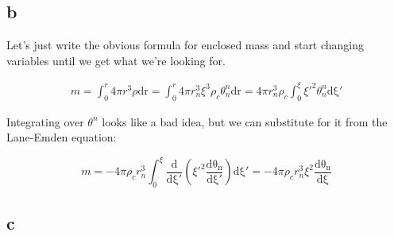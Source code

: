 \documentclass[12pt]{article}
\begin{document}
\subsection*{b}

Let's just write the obvious formula for enclosed mass and start changing variables until we get what we're looking for.

\begin{align*}
m = \int_0^r 4\pi r^3\rho\mathrm{dr} = \int_0^{r}4\pi r_n^3 \xi^3 \rho_c \theta^n_n \mathrm{dr} = 4\pi r_n^3 \rho_c\int_0^{\xi}\xi'^2\theta_n^n\mathrm{d\xi'}
\end{align*}

Integrating over \(\theta^n\) looks like a bad idea, but we can substitute for it from the Lane-Emden equation:

\[ m = -4\pi \rho_c r_n^3 \int_0^{\xi} \frac{\mathrm{d}}{\mathrm{d\xi'}}\left(\xi'^2\frac{\mathrm{d\theta_n}}{\mathrm{d\xi'}} \right)\mathrm{d\xi'} = -4\pi\rho_c r_n^3 \xi^2 \frac{\mathrm{d\theta_n}}{\mathrm{d\xi}}
\]

\subsection*{c}
\end{document}
